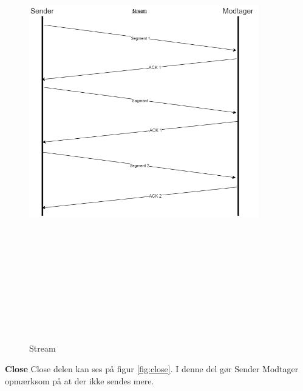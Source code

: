 \begin{figure}[ht]
	\centering
	\includegraphics[width=10cm,height=20cm,keepaspectratio]{pictures/Stream.png}
	\caption{Stream}
	\label{fig:stream}
\end{figure}

\hfill \break
\hfill \break
\textbf{Close}
\newline
Close delen kan ses på figur \ref{fig:close}.
\newline
I denne del gør Sender Modtager opmærksom på at der ikke sendes mere.

